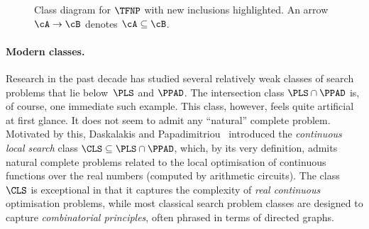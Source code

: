\begin{figure}[t]
\centering
{}
\vspace{1mm}
\caption{Class diagram for $\TFNP$ with new inclusions highlighted. An arrow $\cA\to\cB$ denotes $\cA\subseteq \cB$.}
\label{fig:classes}
\vspace{1mm}
\end{figure}

\paragraph{Modern classes.}
Research in the past decade has studied several relatively weak classes of search problems that lie below~$\PLS$ and $\PPAD$. The intersection class $\PLS\cap\PPAD$ is, of course, one immediate such example. This class, however, feels quite artificial at first glance. It does not seem to admit any ``natural'' complete problem. Motivated by this, Daskalakis and Papadimitriou~\cite{Daskalakis2011} introduced the \emph{continuous local search} class $\CLS\subseteq \PLS\cap\PPAD$, which, by its very definition, admits natural complete problems related to the local optimisation of continuous functions over the real numbers (computed by arithmetic circuits). The class $\CLS$ is exceptional in that it captures the complexity of \emph{real continuous} optimisation problems, while most classical search problem classes are designed to capture \emph{combinatorial principles}, often phrased in terms of directed graphs.

